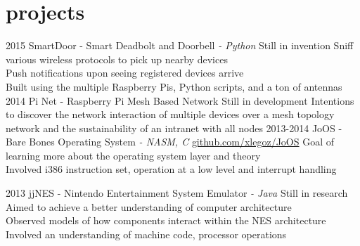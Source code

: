 \documentclass[]{friggeri-cv-short}
\begin{document}
\section{projects}

\begin{entrylist}
  \entry
  	{2015}
  	{SmartDoor \textsf{- Smart Deadbolt and Doorbell \em{- Python}}}
  	{Still in invention}
    {Sniff various wireless protocols to pick up nearby devices \\
     Push notifications upon seeing registered devices arrive \\
  	Built using the multiple Raspberry Pis, Python scripts, and a ton of antennas }
  \entry
  	{2014}
  	{Pi Net \textsf{- Raspberry Pi Mesh Based Network}}
  	{Still in development}
  	{Intentions to discover the network interaction of multiple devices over a mesh topology network and the sustainability of an intranet with all nodes}
  \entry
    {2013-2014}
    {JoOS \textsf{- Bare Bones Operating System \em{- NASM, C}}}
    {\href{http://github.com/xlegoz/JoOS}{github.com/xlegoz/JoOS}}
    {Goal of learning more about the operating system layer and theory \\
    Involved i386 instruction set, operation at a low level and interrupt handling}
 
  \entry
  	{2013}
  	{jjNES \textsf{- Nintendo Entertainment System Emulator \em{- Java}}}
  	{Still in research}
  	{Aimed to achieve a better understanding of computer architecture \\
  	Observed models of how components interact within the NES architecture \\
  	Involved an understanding of machine code, processor operations}
\end{entrylist}
\end{document}

